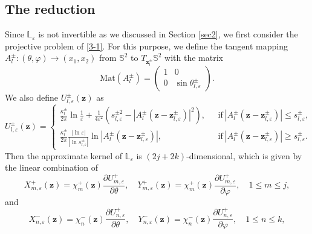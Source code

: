 \documentclass[12pt,reqno]{amsart}
\numberwithin{equation}{section}
\theoremstyle{definition}
\theoremstyle{remark}
\begin{document}
   \subsection{The reduction}
   
   Since $\mathbb L_\varepsilon$ is not invertible as we discussed in Section \ref{sec2}, we first consider the projective problem of \eqref{3-1}. For this purpose, we define the tangent mapping $A_l^\pm: (\theta,\varphi)\to (x_1,x_2)$ from $\mathbb S^2$ to $T_{\boldsymbol z_l^\pm}\mathbb S^2$ with the matrix 
   \begin{equation*}
   	\mathrm{Mat}(A_l^\pm)=\left(
   	\begin{array}{ccc}
   		1 & 0             \\
   		0 & \sin\theta_{l,\varepsilon}^\pm
   	\end{array}
   	\right).
   \end{equation*}
   We also define $U^\pm_{l,\varepsilon}(\boldsymbol z)$ as 
   \begin{equation*}
   	U^\pm_{l,\varepsilon}(\boldsymbol z)=\left\{
   	\begin{array}{lll}
   		\frac{\kappa_l^\pm}{2\pi}\ln\frac{1}{\varepsilon}+\frac{1}{4\varepsilon^2}(s_{l,\varepsilon}^{\pm2}-|A_l^{\pm}(\boldsymbol z-\boldsymbol z^\pm_{l,\varepsilon})|^2), \ \ \ &\mathrm{if} \ |A_l^{\pm}(\boldsymbol z-\boldsymbol z^\pm_{l,\varepsilon})|\le s_{l,\varepsilon}^\pm,\\
   		\frac{\kappa_l^\pm}{2\pi}\frac{|\ln\varepsilon|}{|\ln s_{l,\varepsilon}^\pm|}\ln|A_l^{\pm}(\boldsymbol z-\boldsymbol z^\pm_{l,\varepsilon})|,&\mathrm{if} \ |A_l^{\pm}(\boldsymbol z-\boldsymbol z^\pm_{l,\varepsilon})|\ge s_{l,\varepsilon}^\pm.
   	\end{array}
   	\right.
   \end{equation*}
   Then the approximate kernel of $\mathbb L_\varepsilon$ is $(2j+2k)$-dimensional, which is given by the linear combination of
   \begin{equation*}
   	X_{m,\varepsilon}^+({\boldsymbol z})=\chi_m^+({\boldsymbol z})\frac{\partial U^+_{m,\varepsilon}}{\partial \theta}, 
	\quad Y_{m,\varepsilon}^+({\boldsymbol z})=\chi_m^+({\boldsymbol z})\frac{\partial U^+_{m,\varepsilon}}{\partial \varphi}, \quad 1\le m\le j,
   \end{equation*}
   and
   \begin{equation*}
   	X_{n,\varepsilon}^-({\boldsymbol z})=\chi_n^-({\boldsymbol z})\frac{\partial U^+_{n,\varepsilon}}{\partial \theta}, 
	\quad Y_{n,\varepsilon}^-({\boldsymbol z})=\chi_n^-({\boldsymbol z})\frac{\partial U^+_{n,\varepsilon}}{\partial \varphi}, \quad 1\le n\le k,
   \end{equation*}
\end{document}
